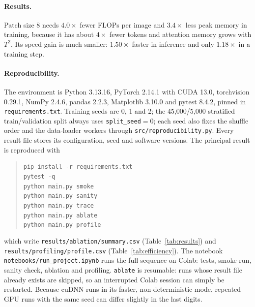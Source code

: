 \documentclass{article}
\begin{document}
\paragraph{Results.}
Patch size 8 needs $4.0\times$ fewer FLOPs per image and $3.4\times$ less
peak memory in training, because it has about $4\times$ fewer tokens and
attention memory grows with $T^2$. Its speed gain is much smaller:
$1.50\times$ faster in inference and only $1.18\times$ in a training step.


\paragraph{Reproducibility.}
The environment is Python 3.13.16, PyTorch 2.14.1 with CUDA 13.0,
torchvision 0.29.1, NumPy 2.4.6, pandas 2.2.3, Matplotlib 3.10.0 and pytest
8.4.2, pinned in \texttt{requirements.txt}. Training seeds are 0, 1 and 2;
the 45{,}000/5{,}000 stratified train/validation split always uses
\texttt{split\_seed}${}=0$; each seed also fixes the shuffle order and the
data-loader workers through \texttt{src/reproducibility.py}. Every result
file stores its configuration, seed and software versions. The principal
result is reproduced with
\begin{quote}\small
\texttt{pip install -r requirements.txt}\\
\texttt{pytest -q}\\
\texttt{python main.py smoke}\\
\texttt{python main.py sanity}\\
\texttt{python main.py trace}\\
\texttt{python main.py ablate}\\
\texttt{python main.py profile}
\end{quote}
which write \texttt{results/ablation/summary.csv} (Table~\ref{tab:results})
and \texttt{results/profiling/profile.csv} (Table~\ref{tab:efficiency}).
The notebook \texttt{notebooks/run\_project.ipynb} runs the full sequence
on Colab: tests, smoke run, sanity check, ablation and profiling.
\texttt{ablate} is resumable: runs whose result file already exists are
skipped, so an interrupted Colab session can simply be restarted. Because
cuDNN runs in its faster, non-deterministic mode, repeated GPU runs with
the same seed can differ slightly in the last digits.
\end{document}
